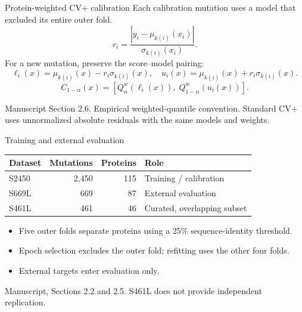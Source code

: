 \documentclass[aspectratio=169,14pt]{beamer}
\newcommand{\sources}[1]{\vfill{\scriptsize\color{Muted}#1\par}}
\begin{document}
\begin{frame}{Protein-weighted CV+ calibration}
  Each calibration mutation uses a model that excluded its entire outer fold.
  \[
    r_i=\frac{|y_i-\mu_{k(i)}(x_i)|}{\sigma_{k(i)}(x_i)}.
  \]
  For a new mutation, preserve the score--model pairing:
  \[
    \ell_i(x)=\mu_{k(i)}(x)-r_i\sigma_{k(i)}(x),\quad
    u_i(x)=\mu_{k(i)}(x)+r_i\sigma_{k(i)}(x).
  \]
  \[
    C_{1-\alpha}(x)=
    [Q^w_\alpha(\ell_i(x)),\;Q^w_{1-\alpha}(u_i(x))].
  \]
  \sources{Manuscript Section 2.6. Empirical weighted-quantile convention. Standard CV+ uses unnormalized absolute residuals with the same models and weights.}
\end{frame}

\begin{frame}{Training and external evaluation}
  \begin{center}
    \begin{tabular}{lrrl}
      \toprule
      Dataset & Mutations & Proteins & Role \\
      \midrule
      S2450 & 2,450 & 115 & Training / calibration \\
      S669L & 669 & 87 & External evaluation \\
      S461L & 461 & 46 & Curated, overlapping subset \\
      \bottomrule
    \end{tabular}
  \end{center}
  \medskip
  \begin{itemize}
    \item Five outer folds separate proteins using a 25\% sequence-identity threshold.
    \item Epoch selection excludes the outer fold; refitting uses the other four folds.
    \item External targets enter evaluation only.
  \end{itemize}
  \sources{Manuscript, Sections 2.2 and 2.5. S461L does not provide independent replication.}
\end{frame}
\end{document}
